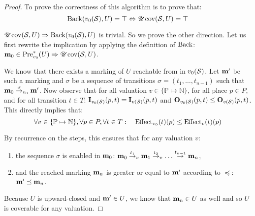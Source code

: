 \begin{proof}
  To prove the correctness of this algorithm is to prove that:
  \[
    \operatorname{Back}(v_0(\mathcal{S}), U) = \top \Leftrightarrow \operatorname{\mathscr{U}cov}(\mathcal{S}, U) = \top
  \]

$\operatorname{\mathscr{U}cov}(\mathcal{S}, U) \Rightarrow \operatorname{Back}(v_0(\mathcal{S}), U)$ is trivial. So we prove the other direction. Let us first rewrite the implication by applying the definition of $\operatorname{Back}$: $\mathbf{m}_0 \in \operatorname{Pre}_{v_0}^*(U) \Rightarrow \operatorname{\mathscr{U}cov}(\mathcal{S}, U)$.


  We know that there exists a marking of $U$ reachable from \mari in $v_0(\mathcal{S})$.
  Let $\mathbf{m'}$ be such a marking and $\sigma$ be a sequence of transitions $\sigma = (t_1, \dots, t_{n-1})$ such that $\mathbf{m}_0 \stackrel{\sigma}{\to}_{v_0} \mathbf{m'}$.
  Now observe that for all valuation $v\in \{\mathbb{P} \mapsto \mathbb{N}\}$, for all place $p \in P$, and for all transition $t \in T$: $\mathbf{I}_{v_0(\mathcal{S})}(p,t) = \mathbf{I}_{v(\mathcal{S})}(p,t)$ and $\mathbf{O}_{v_0(\mathcal{S})}(p,t) \leq \mathbf{O}_{v(\mathcal{S})}(p,t)$. This directly implies that: 
  \[
    \forall v \in \{\mathbb{P} \mapsto \mathbb{N}\}, \forall p \in P, \forall t \in T :
  \quad
  \operatorname{Effect}_{v_0}(t)(p) \leq \operatorname{Effect}_v(t)(p)
  \]

By recurrence on the steps, this ensures that for any valuation $v$:
  \begin{enumerate}
    \item the sequence $\sigma$ is enabled  in $\mathbf{m}_0$: $\mathbf{m}_0 \stackrel{t_1}{\to}_v \mathbf{m}_1 \stackrel{t_2}{\to}_v \dots \stackrel{t_{n-1}}{\to} \mathbf{m}_n$,
    \item and the reached marking $\mathbf{m}_n$ is greater or equal to $\mathbf{m'}$ according to $\preceq$: $\mathbf{m'} \preceq \mathbf{m}_n$.
  \end{enumerate}

  Because $U$ is upward-closed and $\mathbf{m'} \in U$, we know that $\mathbf{m}_n \in U$ as well and so $U$ is coverable for any valuation.
\end{proof}


